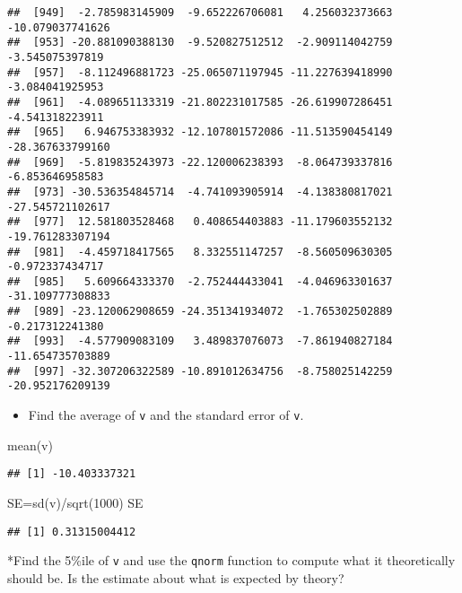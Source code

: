 \documentclass[
]{article}
\newenvironment{Shaded}{\begin{snugshade}}{\end{snugshade}}
\newcommand{\DecValTok}[1]{\textcolor[rgb]{0.00,0.00,0.81}{#1}}
\newcommand{\FunctionTok}[1]{\textcolor[rgb]{0.00,0.00,0.00}{#1}}
\newcommand{\NormalTok}[1]{#1}
\newcommand{\OtherTok}[1]{\textcolor[rgb]{0.56,0.35,0.01}{#1}}
\newcommand{\SpecialCharTok}[1]{\textcolor[rgb]{0.00,0.00,0.00}{#1}}
\providecommand{\tightlist}{%
  \setlength{\itemsep}{0pt}\setlength{\parskip}{0pt}}
\begin{document}
\begin{verbatim}
##  [949]  -2.785983145909  -9.652226706081   4.256032373663 -10.079037741626
##  [953] -20.881090388130  -9.520827512512  -2.909114042759  -3.545075397819
##  [957]  -8.112496881723 -25.065071197945 -11.227639418990  -3.084041925953
##  [961]  -4.089651133319 -21.802231017585 -26.619907286451  -4.541318223911
##  [965]   6.946753383932 -12.107801572086 -11.513590454149 -28.367633799160
##  [969]  -5.819835243973 -22.120006238393  -8.064739337816  -6.853646958583
##  [973] -30.536354845714  -4.741093905914  -4.138380817021 -27.545721102617
##  [977]  12.581803528468   0.408654403883 -11.179603552132 -19.761283307194
##  [981]  -4.459718417565   8.332551147257  -8.560509630305  -0.972337434717
##  [985]   5.609664333370  -2.752444433041  -4.046963301637 -31.109777308833
##  [989] -23.120062908659 -24.351341934072  -1.765302502889  -0.217312241380
##  [993]  -4.577909083109   3.489837076073  -7.861940827184 -11.654735703889
##  [997] -32.307206322589 -10.891012634756  -8.758025142259 -20.952176209139
\end{verbatim}

\begin{itemize}
\tightlist
\item
  Find the average of \texttt{v} and the standard error of \texttt{v}.
\end{itemize}

\begin{Shaded}
\begin{Highlighting}[]
\FunctionTok{mean}\NormalTok{(v)}
\end{Highlighting}
\end{Shaded}

\begin{verbatim}
## [1] -10.403337321
\end{verbatim}

\begin{Shaded}
\begin{Highlighting}[]
\NormalTok{SE}\OtherTok{=}\FunctionTok{sd}\NormalTok{(v)}\SpecialCharTok{/}\FunctionTok{sqrt}\NormalTok{(}\DecValTok{1000}\NormalTok{)}
\NormalTok{SE}
\end{Highlighting}
\end{Shaded}

\begin{verbatim}
## [1] 0.31315004412
\end{verbatim}

*Find the 5\%ile of \texttt{v} and use the \texttt{qnorm} function to
compute what it theoretically should be. Is the estimate about what is
expected by theory?
\end{document}
